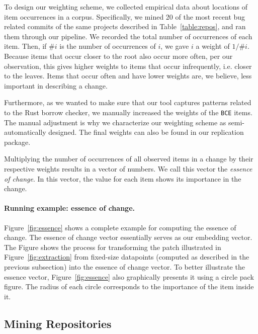 To design our weighting scheme, we collected empirical data about locations of item occurrences in a corpus. Specifically, we mined 20 of the most recent bug related commits of the same projects described in Table~\ref{table:repos}, and ran them through our pipeline. We recorded the total number of occurrences of each item. Then, if $\# i$ is the number of occurrences of $i$, we gave $i$ a weight of $1/\# i$. Because items that occur closer to the root also occur more often, per our observation, this gives higher weights to items that occur infrequently, i.e. closer to the leaves. Items that occur often and have lower weights are, we believe, less important in describing a change.

Furthermore, as we wanted to make sure that our tool captures patterns related to the Rust borrow checker, we manually increased the weights of the \texttt{BCE} items. The manual adjustment is why we characterize our weighting scheme as semi-automatically designed. The final weights can also be found in our replication package.

Multiplying the number of occurrences of all observed items in a change by their respective weights results in a vector of numbers. We call this vector the \emph{essence of change}. In this vector, the value for each item shows its importance in the change. 

\paragraph{Running example: essence of change.} Figure~\ref{fig:essence} shows a complete example for computing the essence of change. The essence of change vector essentially serves as our embedding vector. The Figure shows the process for transforming the patch illustrated in Figure~\ref{fig:extraction} from fixed-size datapoints (computed as described in the previous subsection) into the essence of change vector. To better illustrate the essence vector, Figure~\ref{fig:essence} also graphically presents it using a circle pack figure. The radius of each circle corresponds to the importance of the item inside it.

\subsection{\label{sec:mining_repositories}Mining Repositories}
\label{sec:mining}

